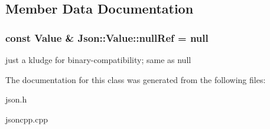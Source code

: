 \subsection{Member Data Documentation}
\hypertarget{class_json_1_1_value_aaa4ffd4e53967170c3e8c9abf682b5cd}{
\subsubsection[{null\-Ref}]{\setlength{\rightskip}{0pt plus 5cm}const {\bf Value} \& Json\-::\-Value\-::null\-Ref = {\bf null}\hspace{0.3cm}{\ttfamily [static]}}}\label{class_json_1_1_value_aaa4ffd4e53967170c3e8c9abf682b5cd}
just a kludge for binary-\/compatibility; same as null 

The documentation for this class was generated from the following files\-:\begin{DoxyCompactItemize}
\item 
json.\-h\item 
jsoncpp.\-cpp\end{DoxyCompactItemize}
